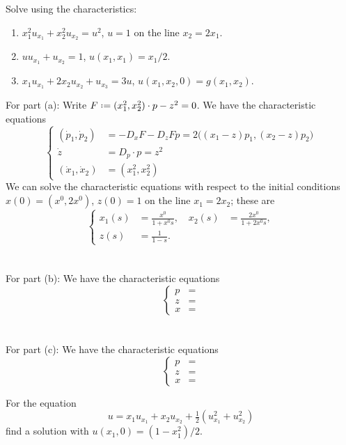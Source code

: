 \begin{problem}
  Solve using the characteristics:
  \begin{enumerate}[label=(\alph*)]
  \item \(x_1^2u_{x_1}+x_2^2u_{x_2}=u^2\), \(u=1\) on the line
    \(x_2=2x_1\).
  \item \(uu_{x_1}+u_{x_2}=1\), \(u(x_1,x_1)=x_1/2\).
  \item \(x_1u_{x_1}+2x_2u_{x_2}+u_{x_3}=3u\),
    \(u(x_1,x_2,0)=g(x_1,x_2)\).
  \end{enumerate}
\end{problem}
\begin{solution*}
  For part (a): Write \(F\defeq (x_1^2,x_2^2)\cdot p-z^2=0\). We have the
  characteristic equations
  \[
    \left\{
      \begin{aligned}
        (\dot p_1,\dot p_2)&=-D_xF-D_zFp=2\bigl((x_1-z)p_1,(x_2-z)p_2\bigr)\\
        \dot z&=D_p\cdot p=z^2\\
        (\dot x_1,\dot x_2)&=(x_1^2,x_2^2)
      \end{aligned}
    \right.
  \]
  We can solve the characteristic equations with respect to the initial
  conditions \(x(0)=(x^0,2x^0)\), \(z(0)=1\) on the line \(x_1=2x_2\);
  these are
  \[
    \left\{
      \begin{aligned}
        x_1(s)&=\frac{x^0}{1+x^0s},\quad
        x_2(s)&=\frac{2x^0}{1+2x^0s},\\
        z(s)&=\frac{1}{1-s}.
      \end{aligned}
    \right.
  \]
  \\\\
  For part (b): We have the characteristic equations
  \[
    \left\{
      \begin{aligned}
        p&=\\
        z&=\\
        x&=
      \end{aligned}
    \right.
  \]
  \\\\
  For part (c): We have the characteristic equations
  \[
    \left\{
      \begin{aligned}
        p&=\\
        z&=\\
       x&=
      \end{aligned}
    \right.
  \]
\end{solution*}

\begin{problem}
  For the equation
  \[
    u=x_1u_{x_1}+x_2u_{x_2}+\tfrac{1}{2}(u_{x_1}^2+u_{x_2}^2)
  \]
  find a solution with \(u(x_1,0)=(1-x_1^2)/2\).
\end{problem}
\begin{solution*}
\end{solution*}

